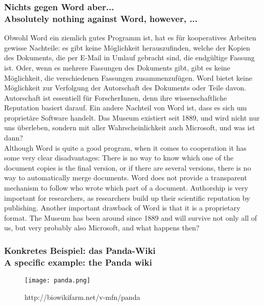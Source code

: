 {\scriptsize
\begin{frame}
  \frametitle{Nichts gegen Word\textsuperscript{\tiny\textregistered} aber... \\
    \textcolor{mfn_green}{Absolutely nothing against Word\textsuperscript{\tiny\textregistered}, however, ...}}
  Obwohl Word ein ziemlich gutes Programm ist, hat es für kooperatives Arbeiten gewisse Nachteile: es gibt keine Möglichkeit herauszufinden, welche der Kopien des Dokuments, die per E-Mail in Umlauf gebracht sind, die endgültige Fassung ist. Oder, wenn es mehrere Fassungen des Dokuments gibt, gibt es keine Möglichkeit, die verschiedenen Fassungen zusammenzufügen. Word bietet keine Möglichkeit zur Verfolgung der Autorschaft des Dokuments oder Teile davon. Autorschaft ist essentiell für ForscherInnen, denn ihre wissenschaftliche Reputation basiert darauf. Ein andere Nachteil von Word ist, dass es sich um proprietäre Software handelt. Das Museum existiert seit 1889, und wird nicht nur uns überleben, sondern mit aller Wahrscheinlichkeit auch Microsoft, und was ist dann?\\
  \bigskip
  \textcolor{mfn_green}{Although Word is quite a good program, when it comes to cooperation it has some very clear disadvantages: There is no way to know which one of the document copies is the final version, or if there are several versions, there is no way to automatically merge documents. Word does not provide a transparent mechanism to follow who wrote which part of a document. Authorship is very important for researchers, as researchers build up their scientific reputation by publishing. Another important drawback of Word is that it is a proprietary format. The Museum has been around since 1889 and will survive not only all of us, but very probably also Microsoft, and what happens then?}
\end{frame}
}
%
%

\begin{frame}
  \frametitle{Konkretes Beispiel: das Panda-Wiki\\\textcolor{mfn_green}{A specific example: the Panda wiki}}
  \begin{figure}
    \texttt{[image: panda.png]}
    \caption{http://biowikifarm.net/v-mfn/panda}
  \end{figure}
\end{frame}

